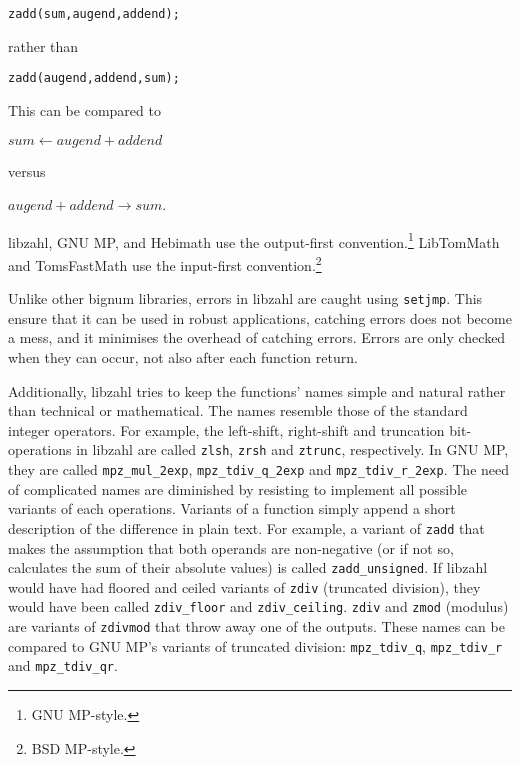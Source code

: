 \begin{alltt}
   zadd(sum, augend, addend);
\end{alltt}

\noindent
rather than

\begin{alltt}
   zadd(augend, addend, sum);
\end{alltt}

\noindent
This can be compared to

\vspace{1em}
$sum \gets augend + addend$
\vspace{1em}

\noindent
versus

\vspace{1em}
$augend + addend \rightarrow sum$.
\vspace{1em}

libzahl, GNU MP, and Hebimath use the output-first
convention.\footnote{GNU MP-style.} LibTomMath and
TomsFastMath use the input-first convention.\footnote{BSD
MP-style.}

Unlike other bignum libraries, errors in libzahl are
caught using {\tt setjmp}. This ensure that it can be
used in robust applications, catching errors does not
become a mess, and it minimises the overhead of
catching errors. Errors are only checked when they can
occur, not also after each function return.

Additionally, libzahl tries to keep the functions'
names simple and natural rather than technical or
mathematical. The names resemble those of the standard
integer operators. For example, the left-shift, right-shift
and truncation bit-operations in libzahl are called
{\tt zlsh}, {\tt zrsh} and {\tt ztrunc}, respectively.
In GNU MP, they are called {\tt mpz\_mul\_2exp},
{\tt mpz\_tdiv\_q\_2exp} and {\tt mpz\_tdiv\_r\_2exp}.
The need of complicated names are diminished by resisting
to implement all possible variants of each operations.
Variants of a function simply append a short description
of the difference in plain text. For example, a variant of
{\tt zadd} that makes the assumption that both operands
are non-negative (or if not so, calculates the sum of
their absolute values) is called {\tt zadd\_unsigned}.
If libzahl would have had floored and ceiled variants of
{\tt zdiv} (truncated division), they would have been
called {\tt zdiv\_floor} and {\tt zdiv\_ceiling}.
{\tt zdiv} and {\tt zmod} (modulus) are variants of
{\tt zdivmod} that throw away one of the outputs. These
names can be compared to GNU MP's variants of truncated
division: {\tt mpz\_tdiv\_q}, {\tt mpz\_tdiv\_r} and
{\tt mpz\_tdiv\_qr}.


